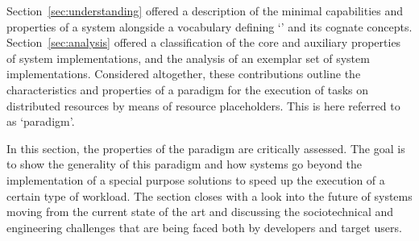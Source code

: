 \documentclass{sig-alternate}
\begin{document}




Section~\ref{sec:understanding} offered a description of the minimal
capabilities and properties of a \pilot system alongside a vocabulary defining
`\pilot' and its cognate concepts. Section~\ref{sec:analysis} offered a
classification of the core and auxiliary properties of \pilot system
implementations, and the analysis of an exemplar set of \pilot system
implementations. Considered altogether, these contributions outline the
characteristics and properties of a paradigm for the execution of tasks on
distributed resources by means of resource placeholders. This is here referred
to as `\pilot paradigm'.

In this section, the properties of the \pilot paradigm are critically assessed.
The goal is to show the generality of this paradigm and how \pilot systems go
beyond the implementation of a special purpose solutions to speed up the
execution of a certain type of workload.
The section closes with a look into the future of \pilot systems moving from the
current state of the art and discussing the sociotechnical and engineering
challenges that are being faced both by developers and target users.
\end{document}
